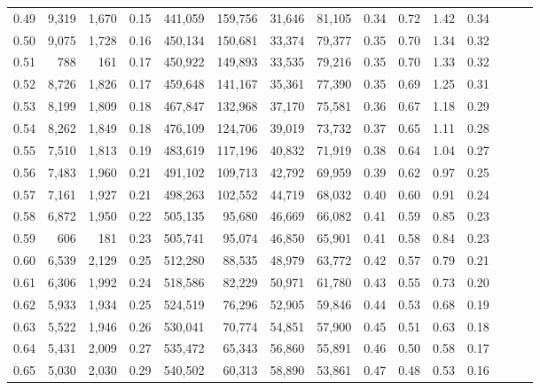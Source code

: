 \begin{tabular}{rrrrrrrrrrrrrrr}
0.49 &   9,319 &  1,670 &  0.15 &  441,059 &  159,756 &   31,646 &   81,105 &  0.34 &  0.72 &  1.42 &      0.34 \\
0.50 &   9,075 &  1,728 &  0.16 &  450,134 &  150,681 &   33,374 &   79,377 &  0.35 &  0.70 &  1.34 &      0.32 \\
0.51 &     788 &    161 &  0.17 &  450,922 &  149,893 &   33,535 &   79,216 &  0.35 &  0.70 &  1.33 &      0.32 \\
0.52 &   8,726 &  1,826 &  0.17 &  459,648 &  141,167 &   35,361 &   77,390 &  0.35 &  0.69 &  1.25 &      0.31 \\
0.53 &   8,199 &  1,809 &  0.18 &  467,847 &  132,968 &   37,170 &   75,581 &  0.36 &  0.67 &  1.18 &      0.29 \\
0.54 &   8,262 &  1,849 &  0.18 &  476,109 &  124,706 &   39,019 &   73,732 &  0.37 &  0.65 &  1.11 &      0.28 \\
0.55 &   7,510 &  1,813 &  0.19 &  483,619 &  117,196 &   40,832 &   71,919 &  0.38 &  0.64 &  1.04 &      0.27 \\
0.56 &   7,483 &  1,960 &  0.21 &  491,102 &  109,713 &   42,792 &   69,959 &  0.39 &  0.62 &  0.97 &      0.25 \\
0.57 &   7,161 &  1,927 &  0.21 &  498,263 &  102,552 &   44,719 &   68,032 &  0.40 &  0.60 &  0.91 &      0.24 \\
0.58 &   6,872 &  1,950 &  0.22 &  505,135 &   95,680 &   46,669 &   66,082 &  0.41 &  0.59 &  0.85 &      0.23 \\
0.59 &     606 &    181 &  0.23 &  505,741 &   95,074 &   46,850 &   65,901 &  0.41 &  0.58 &  0.84 &      0.23 \\
0.60 &   6,539 &  2,129 &  0.25 &  512,280 &   88,535 &   48,979 &   63,772 &  0.42 &  0.57 &  0.79 &      0.21 \\
0.61 &   6,306 &  1,992 &  0.24 &  518,586 &   82,229 &   50,971 &   61,780 &  0.43 &  0.55 &  0.73 &      0.20 \\
0.62 &   5,933 &  1,934 &  0.25 &  524,519 &   76,296 &   52,905 &   59,846 &  0.44 &  0.53 &  0.68 &      0.19 \\
0.63 &   5,522 &  1,946 &  0.26 &  530,041 &   70,774 &   54,851 &   57,900 &  0.45 &  0.51 &  0.63 &      0.18 \\
0.64 &   5,431 &  2,009 &  0.27 &  535,472 &   65,343 &   56,860 &   55,891 &  0.46 &  0.50 &  0.58 &      0.17 \\
0.65 &   5,030 &  2,030 &  0.29 &  540,502 &   60,313 &   58,890 &   53,861 &  0.47 &  0.48 &  0.53 &      0.16 \\

\end{tabular}
